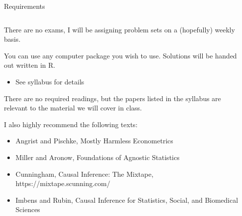 \documentclass[notes,11pt, aspectratio=169]{beamer}
\newenvironment{wideitemize}{\itemize\addtolength{\itemsep}{10pt}}{\enditemize}
\begin{document}
\begin{frame}{Requirements }
\begin{columns}[T] %
\begin{column}{.7\textwidth}
  \begin{wideitemize}
  \item There are no exams, I will be assigning problem sets on a (hopefully) weekly basis.
  \item You can use any computer package you wish to use. Solutions will be handed out written in R. 
    \begin{itemize}
    \item See syllabus for details
    \end{itemize}
  \item There are no required readings, but the papers listed in the
    syllabus are relevant to the material we will cover in class.
  \item I also highly recommend the following texts:
    \begin{itemize}
    \item Angrist and  Pischke, Mostly Harmless Econometrics
    \item  Miller and Aronow, Foundations of Agnostic Statistics
    \item  Cunningham, Causal Inference: The Mixtape, https://mixtape.scunning.com/
    \item Imbens and Rubin, Causal Inference for Statistics, Social, and Biomedical Sciences      
    \end{itemize}
  \end{wideitemize}
\end{column}%
\hfill%
\begin{column}{.38\textwidth}
  \makebox[\linewidth][c]{
    \resizebox{\linewidth}{!}{
    }
  }
\end{column}%
\end{columns}
\end{frame}
\end{document}
